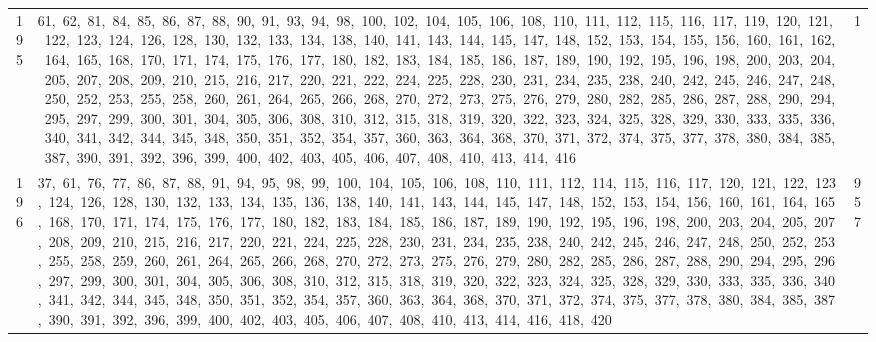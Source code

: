 \begin{longtable}{c|p{}|r}
195 & 61,\ 62,\ 81,\ 84,\ 85,\ 86,\ 87,\ 88,\ 90,\ 91,\ 93,\ 94,\ 98,\ 100,\ 102,\ 104,\ 105,\ 106,\ 108,\ 110,\ 111,\ 112,\ 115,\ 116,\ 117,\ 119,\ 120,\ 121,\ 122,\ 123,\ 124,\ 126,\ 128,\ 130,\ 132,\ 133,\ 134,\ 138,\ 140,\ 141,\ 143,\ 144,\ 145,\ 147,\ 148,\ 152,\ 153,\ 154,\ 155,\ 156,\ 160,\ 161,\ 162,\ 164,\ 165,\ 168,\ 170,\ 171,\ 174,\ 175,\ 176,\ 177,\ 180,\ 182,\ 183,\ 184,\ 185,\ 186,\ 187,\ 189,\ 190,\ 192,\ 195,\ 196,\ 198,\ 200,\ 203,\ 204,\ 205,\ 207,\ 208,\ 209,\ 210,\ 215,\ 216,\ 217,\ 220,\ 221,\ 222,\ 224,\ 225,\ 228,\ 230,\ 231,\ 234,\ 235,\ 238,\ 240,\ 242,\ 245,\ 246,\ 247,\ 248,\ 250,\ 252,\ 253,\ 255,\ 258,\ 260,\ 261,\ 264,\ 265,\ 266,\ 268,\ 270,\ 272,\ 273,\ 275,\ 276,\ 279,\ 280,\ 282,\ 285,\ 286,\ 287,\ 288,\ 290,\ 294,\ 295,\ 297,\ 299,\ 300,\ 301,\ 304,\ 305,\ 306,\ 308,\ 310,\ 312,\ 315,\ 318,\ 319,\ 320,\ 322,\ 323,\ 324,\ 325,\ 328,\ 329,\ 330,\ 333,\ 335,\ 336,\ 340,\ 341,\ 342,\ 344,\ 345,\ 348,\ 350,\ 351,\ 352,\ 354,\ 357,\ 360,\ 363,\ 364,\ 368,\ 370,\ 371,\ 372,\ 374,\ 375,\ 377,\ 378,\ 380,\ 384,\ 385,\ 387,\ 390,\ 391,\ 392,\ 396,\ 399,\ 400,\ 402,\ 403,\ 405,\ 406,\ 407,\ 408,\ 410,\ 413,\ 414,\ 416 & 1 \\
196 & 37,\ 61,\ 76,\ 77,\ 86,\ 87,\ 88,\ 91,\ 94,\ 95,\ 98,\ 99,\ 100,\ 104,\ 105,\ 106,\ 108,\ 110,\ 111,\ 112,\ 114,\ 115,\ 116,\ 117,\ 120,\ 121,\ 122,\ 123,\ 124,\ 126,\ 128,\ 130,\ 132,\ 133,\ 134,\ 135,\ 136,\ 138,\ 140,\ 141,\ 143,\ 144,\ 145,\ 147,\ 148,\ 152,\ 153,\ 154,\ 156,\ 160,\ 161,\ 164,\ 165,\ 168,\ 170,\ 171,\ 174,\ 175,\ 176,\ 177,\ 180,\ 182,\ 183,\ 184,\ 185,\ 186,\ 187,\ 189,\ 190,\ 192,\ 195,\ 196,\ 198,\ 200,\ 203,\ 204,\ 205,\ 207,\ 208,\ 209,\ 210,\ 215,\ 216,\ 217,\ 220,\ 221,\ 224,\ 225,\ 228,\ 230,\ 231,\ 234,\ 235,\ 238,\ 240,\ 242,\ 245,\ 246,\ 247,\ 248,\ 250,\ 252,\ 253,\ 255,\ 258,\ 259,\ 260,\ 261,\ 264,\ 265,\ 266,\ 268,\ 270,\ 272,\ 273,\ 275,\ 276,\ 279,\ 280,\ 282,\ 285,\ 286,\ 287,\ 288,\ 290,\ 294,\ 295,\ 296,\ 297,\ 299,\ 300,\ 301,\ 304,\ 305,\ 306,\ 308,\ 310,\ 312,\ 315,\ 318,\ 319,\ 320,\ 322,\ 323,\ 324,\ 325,\ 328,\ 329,\ 330,\ 333,\ 335,\ 336,\ 340,\ 341,\ 342,\ 344,\ 345,\ 348,\ 350,\ 351,\ 352,\ 354,\ 357,\ 360,\ 363,\ 364,\ 368,\ 370,\ 371,\ 372,\ 374,\ 375,\ 377,\ 378,\ 380,\ 384,\ 385,\ 387,\ 390,\ 391,\ 392,\ 396,\ 399,\ 400,\ 402,\ 403,\ 405,\ 406,\ 407,\ 408,\ 410,\ 413,\ 414,\ 416,\ 418,\ 420 & 957 \\

\end{longtable}
